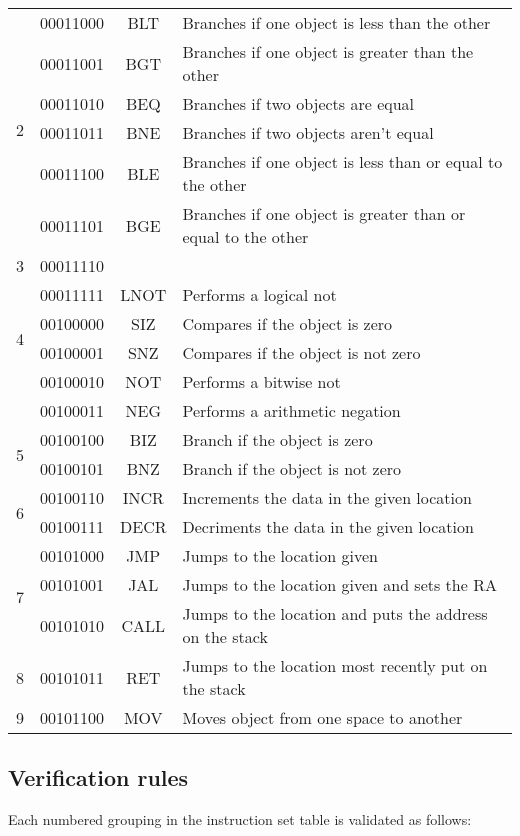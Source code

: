 \documentclass[12pt]{article}
\begin{document}
\begin{tabular}{| r | r | c | l |}
\hline
\multirow{6}{*}{2} & 00011000 & BLT & Branches if one object is less than the other\\
& 00011001 & BGT & Branches if one object is greater than the other\\
& 00011010 & BEQ & Branches if two objects are equal\\
& 00011011 & BNE & Branches if two objects aren't equal\\
& 00011100 & BLE & Branches if one object is less than or equal to the other\\
& 00011101 & BGE & Branches if one object is greater than or equal to the other\\
\hline
3 & 00011110 & &\\
\hline
\multirow{4}{*}{4} & 00011111 & LNOT & Performs a logical not\\
& 00100000 & SIZ & Compares if the object is zero\\
& 00100001 & SNZ & Compares if the object is not zero\\
& 00100010 & NOT & Performs a bitwise not\\
& 00100011 & NEG & Performs a arithmetic negation\\
\hline
\multirow{2}{*}{5} & 00100100 & BIZ & Branch if the object is zero\\
& 00100101 & BNZ & Branch if the object is not zero\\
\hline
\multirow{2}{*}{6} & 00100110 & INCR & Increments the data in the given location\\
& 00100111 & DECR & Decriments the data in the given location\\
\hline
\multirow{3}{*}{7} & 00101000 & JMP & Jumps to the location given\\
& 00101001 & JAL & Jumps to the location given and sets the RA\\
& 00101010 & CALL & Jumps to the location and puts the address on the stack\\
\hline
8 & 00101011 & RET & Jumps to the location most recently put on the stack\\
\hline
9 & 00101100 & MOV & Moves object from one space to another\\
\hline
\end{tabular}

\subsection{Verification rules}
Each numbered grouping in the instruction set table is validated as follows:
\end{document}
